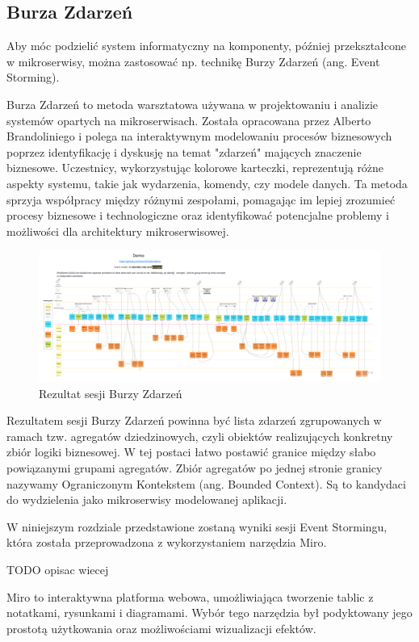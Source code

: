 \subsection{Burza Zdarzeń}

Aby móc podzielić system informatyczny na komponenty, później przekształcone w mikroserwisy, można zastosować np. technikę Burzy Zdarzeń (ang. Event Storming).

Burza Zdarzeń to metoda warsztatowa używana w projektowaniu i analizie systemów opartych na mikroserwisach. Została opracowana przez Alberto Brandoliniego i polega na interaktywnym modelowaniu procesów biznesowych poprzez identyfikację i dyskusję na temat "zdarzeń" mających znaczenie biznesowe. Uczestnicy, wykorzystując kolorowe karteczki, reprezentują różne aspekty systemu, takie jak wydarzenia, komendy, czy modele danych. Ta metoda sprzyja współpracy między różnymi zespołami, pomagając im lepiej zrozumieć procesy biznesowe i technologiczne oraz identyfikować potencjalne problemy i możliwości dla architektury mikroserwisowej.

\begin{figure}[!h]
    \centering \includegraphics[width=0.8\linewidth]{event_storming.png}
    \caption{Rezultat sesji Burzy Zdarzeń \cite{event_storming_rys}}
\end{figure}


Rezultatem sesji Burzy Zdarzeń powinna być lista zdarzeń zgrupowanych w ramach tzw. agregatów dziedzinowych, czyli obiektów realizujących konkretny zbiór logiki biznesowej. W tej postaci łatwo postawić granice między słabo powiązanymi grupami agregatów. Zbiór agregatów po jednej stronie granicy nazywamy Ograniczonym Kontekstem (ang. Bounded Context). Są to kandydaci do wydzielenia jako mikroserwisy modelowanej aplikacji.

W niniejszym rozdziale przedstawione zostaną wyniki sesji Event Stormingu, która została przeprowadzona z wykorzystaniem narzędzia Miro.

TODO opisac wiecej

Miro \cite{miro} to interaktywna platforma webowa, umożliwiająca tworzenie tablic z notatkami, rysunkami i diagramami. Wybór tego narzędzia był podyktowany jego prostotą użytkowania oraz możliwościami wizualizacji efektów.

